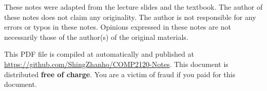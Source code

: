 \begin{remark}
    
These notes were adapted from the lecture slides and the textbook. The author of these notes
does not claim any originality. The author is not responsible for any errors or typos in these notes.
Opinions expressed in these notes are not necessarily those of the author(s) of the original materials.

This PDF file is compiled at \DTMnow automatically and published at 
\textcolor{blue}{\url{https://github.com/ShingZhanho/COMP2120-Notes}}.
This document is distributed \textbf{free of charge}. You are a victim of fraud if you paid for this document.

\end{remark}